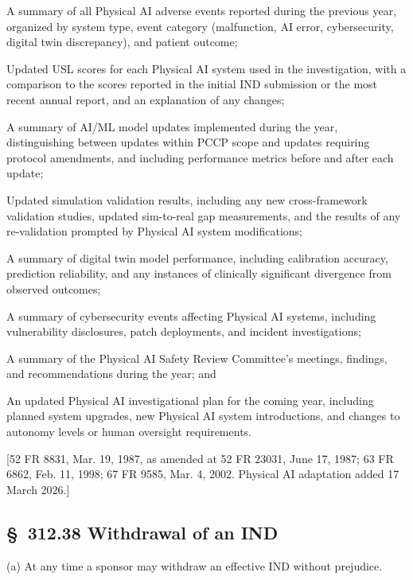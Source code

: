 \begin{description}[leftmargin=0.8cm,style=sameline]
\item[(i)] A summary of all Physical AI adverse events reported during the previous year, organized by system type, event category (malfunction, AI error, cybersecurity, digital twin discrepancy), and patient outcome;
\item[(ii)] Updated USL scores for each Physical AI system used in the investigation, with a comparison to the scores reported in the initial IND submission or the most recent annual report, and an explanation of any changes;
\item[(iii)] A summary of AI/ML model updates implemented during the year, distinguishing between updates within PCCP scope and updates requiring protocol amendments, and including performance metrics before and after each update;
\item[(iv)] Updated simulation validation results, including any new cross-framework validation studies, updated sim-to-real gap measurements, and the results of any re-validation prompted by Physical AI system modifications;
\item[(v)] A summary of digital twin model performance, including calibration accuracy, prediction reliability, and any instances of clinically significant divergence from observed outcomes;
\item[(vi)] A summary of cybersecurity events affecting Physical AI systems, including vulnerability disclosures, patch deployments, and incident investigations;
\item[(vii)] A summary of the Physical AI Safety Review Committee's meetings, findings, and recommendations during the year; and
\item[(viii)] An updated Physical AI investigational plan for the coming year, including planned system upgrades, new Physical AI system introductions, and changes to autonomy levels or human oversight requirements.
\end{description}

[52 FR 8831, Mar. 19, 1987, as amended at 52 FR 23031, June 17, 1987; 63 FR 6862, Feb. 11, 1998; 67 FR 9585, Mar. 4, 2002. Physical AI adaptation added 17 March 2026.]

\subsection{\S~312.38 Withdrawal of an IND}

(a) At any time a sponsor may withdraw an effective IND without prejudice.

